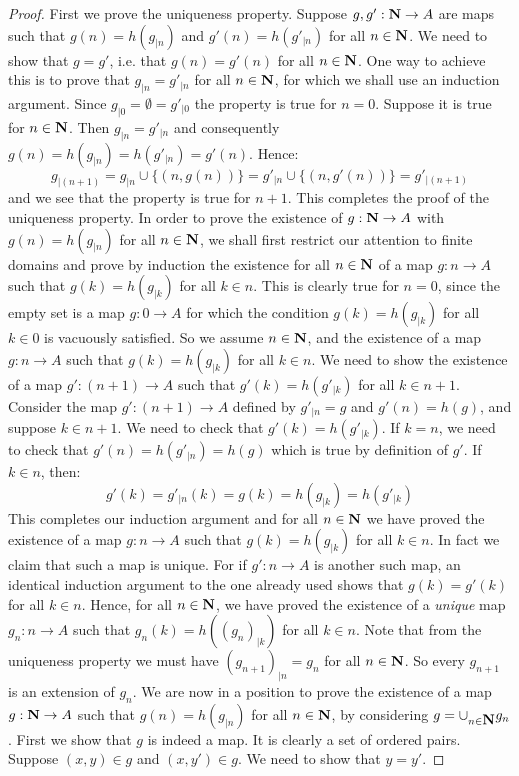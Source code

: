 \begin{proof}
First we prove the uniqueness property. Suppose $g,g':\mbox{$\bf N$}\to A$ are
maps such that $g(n)=h(g_{|n})$ and $g'(n)=h(g'_{|n})$ for all
$n\in\mbox{$\bf N$}$. We need to show that $g=g'$, i.e. that $g(n)=g'(n)$ for
all $n\in\mbox{$\bf N$}$. One way to achieve this is to prove that
$g_{|n}=g'_{|n}$ for all $n\in\mbox{$\bf N$}$, for which we shall use an
induction argument. Since $g_{|0}=\emptyset=g'_{|0}$ the property is
true for $n=0$. Suppose it is true for $n\in\mbox{$\bf N$}$. Then
$g_{|n}=g'_{|n}$ and consequently $g(n)=h(g_{|n})=h(g'_{|n}) =
g'(n)$. Hence:
    \[
    g_{|(n+1)}=g_{|n}\cup\{(n,g(n))\}=g'_{|n}\cup\{(n,g'(n))\}=g'_{|(n+1)}
    \]
and we see that the property is true for $n+1$. This completes the
proof of the uniqueness property. In order to prove the existence of
$g:\mbox{$\bf N$}\to A$ with $g(n)=h(g_{|n})$ for all $n\in\mbox{$\bf N$}$, we shall first
restrict our attention to finite domains and prove by induction the
existence for all $n\in\mbox{$\bf N$}$ of a map $g:n\to A$ such that
$g(k)=h(g_{|k})$ for all $k\in n$. This is clearly true for $n=0$,
since the empty set is a map $g:0\to A$ for which the condition
$g(k)=h(g_{|k})$ for all $k\in 0$ is vacuously satisfied. So we
assume $n\in \mbox{$\bf N$}$, and the existence of a map $g:n\to A$ such that
$g(k)=h(g_{|k})$ for all $k\in n$. We need to show the existence of
a map $g':(n+1)\to A$ such that $g'(k)=h(g'_{|k})$ for all $k\in
n+1$. Consider the map $g':(n+1)\to A$ defined by $g'_{|n}=g$ and
$g'(n)=h(g)$, and suppose $k\in n+1$. We need to check that
$g'(k)=h(g'_{|k})$. If $k=n$, we need to check that
$g'(n)=h(g'_{|n})=h(g)$ which is true by definition of $g'$. If
$k\in n$, then:
    \[
    g'(k)=g'_{|n}(k)=g(k)=h(g_{|k})=h(g'_{|k})
    \]
This completes our induction argument and for all $n\in\mbox{$\bf N$}$ we have
proved the existence of a map $g:n\to A$ such that $g(k)=h(g_{|k})$
for all $k\in n$. In fact we claim that such a map is unique. For if
$g':n\to A$ is another such map, an identical induction argument to
the one already used shows that $g(k)=g'(k)$ for all $k\in n$.
Hence, for all $n\in\mbox{$\bf N$}$, we have proved the existence of a {\em
unique} map $g_{n}:n\to A$ such that $g_{n}(k)=h((g_{n})_{|k})$ for
all $k\in n$. Note that from the uniqueness property we must have
$(g_{n+1})_{|n}=g_{n}$ for all $n\in\mbox{$\bf N$}$. So every $g_{n+1}$ is an
extension of $g_{n}$. We are now in a position to prove the
existence of a map $g:\mbox{$\bf N$}\to A$ such that $g(n)=h(g_{|n})$ for all
$n\in\mbox{$\bf N$}$, by considering $g=\cup_{n\in\mbox{$\bf N$}}g_{n}$. First we show that
$g$ is indeed a map. It is clearly a set of ordered pairs. Suppose
$(x,y)\in g$ and $(x,y')\in g$. We need to show that $y=y'$.

\end{proof}

